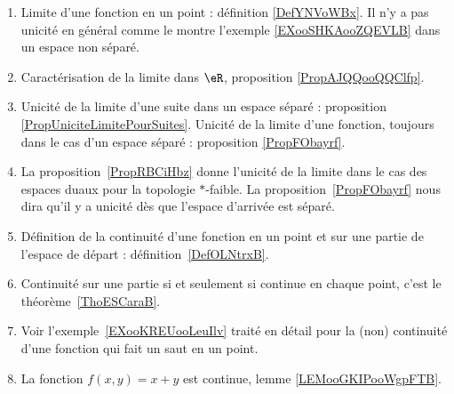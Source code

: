 
    \label{THEMEooGVCCooHBrNNd}
\begin{enumerate}
	\item
	      Limite d'une fonction en un point : définition \ref{DefYNVoWBx}. Il n'y a pas unicité en général comme le montre l'exemple \ref{EXooSHKAooZQEVLB} dans un espace non séparé.
	\item
	      Caractérisation de la limite dans \( \eR\), proposition \ref{PropAJQQooQQClfp}.
	\item
	      Unicité de la limite d'une suite dans un espace séparé : proposition \ref{PropUniciteLimitePourSuites}. Unicité de la limite d'une fonction, toujours dans le cas d'un espace séparé : proposition \ref{PropFObayrf}.
	\item
	      La proposition~\ref{PropRBCiHbz} donne l'unicité de la limite dans le cas des espaces duaux pour la topologie \( *\)-faible. La proposition~\ref{PropFObayrf} nous dira qu'il y a unicité dès que l'espace d'arrivée est séparé.
	\item
	      Définition de la continuité d'une fonction en un point et sur une partie de l'espace de départ : définition~\ref{DefOLNtrxB}.
	\item
	      Continuité sur une partie si et seulement si continue en chaque point, c'est le théorème~\ref{ThoESCaraB}.
	\item
	      Voir l'exemple~\ref{EXooKREUooLeuIlv} traité en détail pour la (non) continuité d'une fonction qui fait un saut en un point.
	\item
	      La fonction \( f(x,y)=x+y\) est continue, lemme \ref{LEMooGKIPooWgpFTB}.
\end{enumerate}
